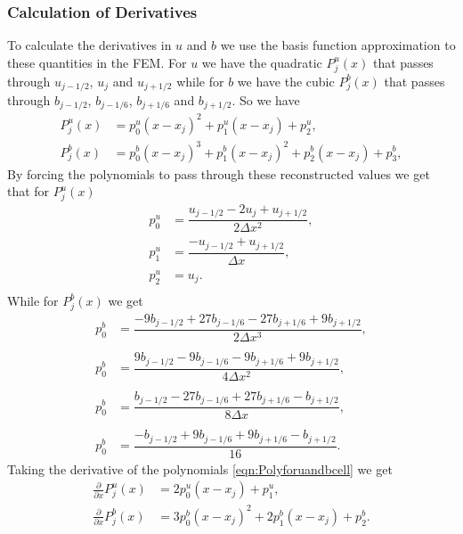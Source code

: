 \subsubsection{Calculation of Derivatives}
To calculate the derivatives in $u$ and $b$ we use the basis function approximation to these quantities in the FEM. For $u$ we have the quadratic $P_j^u(x)$ that passes through $u_{j-1/2}$, $u_j$ and $u_{j+1/2}$ while for $b$ we have the cubic $P_j^b(x)$ that passes through $b_{j-1/2}$, $b_{j-1/6}$, $b_{j+1/6}$ and $b_{j+1/2}$. So we have 
\begin{subequations}
	\begin{align}
	P^u_j(x) &= p^u_0 \left(x - x_j\right)^2 + p^u_1 \left(x - x_j\right) + p^u_2, \\
	P^b_j(x) &= p^b_0 \left(x - x_j\right)^3 + p^b_1 \left(x - x_j\right)^2 + p^b_2 \left(x - x_j\right)  + p^b_3,
	\end{align}
	\label{eqn:Polyforuandbcell}
\end{subequations}
By forcing the polynomials to pass through these reconstructed values we get that for $P^u_j(x)$
\begin{align*}
p^u_0 &=  \dfrac{u_{j-1/2} - 2u_j + u_{j+1/2}}{2 \Delta x^2},\\
p^u_1 &=  \dfrac{-u_{j-1/2} + u_{j+1/2}}{\Delta x},\\
p^u_2 &=  u_j.\\
\end{align*}
While for $P^b_j(x)$ we get
\begin{align*}
p^b_0 &=  \dfrac{-9b_{j-1/2} + 27b_{j-1/6} - 27 b_{j+1/6} + 9b_{j+1/2}}{2 \Delta x^3},\\ \\
p^b_0 &=  \dfrac{9b_{j-1/2} - 9b_{j-1/6} - 9b_{j+1/6} + 9b_{j+1/2}}{4 \Delta x^2},\\ \\ 
p^b_0 &=  \dfrac{b_{j-1/2} - 27b_{j-1/6} + 27 b_{j+1/6} - b_{j+1/2}}{8 \Delta x},\\\\
p^b_0 &=  \dfrac{-b_{j-1/2}  + 9b_{j-1/6} + 9 b_{j+1/6} - b_{j+1/2}}{16}.
\end{align*}
Taking the derivative of the polynomials \eqref{eqn:Polyforuandbcell} we get
	\begin{align*}
	\frac{\partial }{\partial x}P^u_j(x) &= 2p^u_0 \left(x - x_j\right) + p^u_1, \\
	\frac{\partial }{\partial x}P^b_j(x) &= 3p^b_0 \left(x - x_j\right)^2 + 2p^b_1 \left(x - x_j\right) + p^b_2.
	\end{align*}
